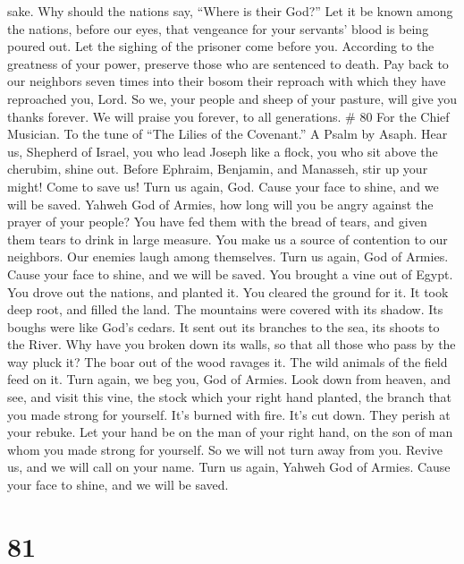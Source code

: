 sake.  Why should the nations say, ``Where is their
God?'' Let it be known among the nations, before our eyes, that
vengeance for your servants' blood is being poured out. 
Let the sighing of the prisoner come before you. According to the
greatness of your power, preserve those who are sentenced to death.
 Pay back to our neighbors seven times into their bosom
their reproach with which they have reproached you, Lord.
 So we, your people and sheep of your pasture, will give
you thanks forever. We will praise you forever, to all generations. \#
80 For the Chief Musician. To the tune of ``The Lilies of the
Covenant.'' A Psalm by Asaph.  Hear us, Shepherd of
Israel, you who lead Joseph like a flock, you who sit above the
cherubim, shine out.  Before Ephraim, Benjamin, and
Manasseh, stir up your might! Come to save us!  Turn us
again, God. Cause your face to shine, and we will be saved.
 Yahweh God of Armies, how long will you be angry against
the prayer of your people?  You have fed them with the
bread of tears, and given them tears to drink in large measure.
 You make us a source of contention to our neighbors. Our
enemies laugh among themselves.  Turn us again, God of
Armies. Cause your face to shine, and we will be saved. 
You brought a vine out of Egypt. You drove out the nations, and planted
it.  You cleared the ground for it. It took deep root, and
filled the land.  The mountains were covered with its
shadow. Its boughs were like God's cedars.  It sent out
its branches to the sea, its shoots to the River.  Why
have you broken down its walls, so that all those who pass by the way
pluck it?  The boar out of the wood ravages it. The wild
animals of the field feed on it.  Turn again, we beg you,
God of Armies. Look down from heaven, and see, and visit this vine,
 the stock which your right hand planted, the branch that
you made strong for yourself.  It's burned with fire.
It's cut down. They perish at your rebuke.  Let your hand
be on the man of your right hand, on the son of man whom you made strong
for yourself.  So we will not turn away from you. Revive
us, and we will call on your name.  Turn us again, Yahweh
God of Armies. Cause your face to shine, and we will be saved.

\hypertarget{section-73}{%
\section{81}\label{section-73}}


